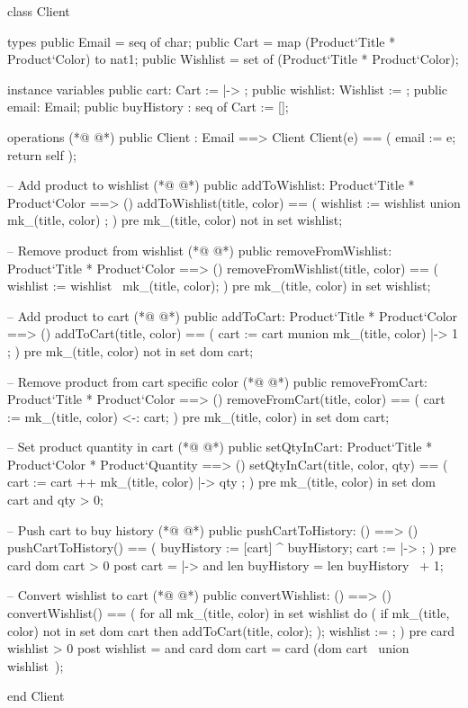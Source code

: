 \begin{vdmpp}[breaklines=true]
class Client

types
 public Email = seq of char;
 public Cart = map (Product`Title * Product`Color) to nat1;
 public Wishlist = set of (Product`Title * Product`Color);
 
instance variables
  public cart: Cart  := { |-> };
  public wishlist: Wishlist := {};
  public email: Email;
  public buyHistory : seq of Cart := [];
  
operations
(*@
\label{Client:15}
@*)
 public Client : Email ==> Client
 Client(e) == (
  email := e;
   return self
 );
 
 -- Add product to wishlist
(*@
\label{addToWishlist:22}
@*)
 public addToWishlist: Product`Title * Product`Color ==> ()
 addToWishlist(title, color) == (
  wishlist := wishlist union { mk_(title, color) };
 )
 pre mk_(title, color) not in set wishlist;
 
 -- Remove product from wishlist
(*@
\label{removeFromWishlist:29}
@*)
 public removeFromWishlist: Product`Title * Product`Color ==> ()
 removeFromWishlist(title, color) == (
  wishlist := wishlist \ {mk_(title, color)};
 )
 pre mk_(title, color) in set wishlist;
 
 -- Add product to cart
(*@
\label{addToCart:36}
@*)
 public addToCart: Product`Title * Product`Color ==> ()
 addToCart(title, color) == (
  cart := cart munion { mk_(title, color) |-> 1 };
 )
 pre mk_(title, color) not in set dom cart;
 
 -- Remove product from cart specific color
(*@
\label{removeFromCart:43}
@*)
 public removeFromCart: Product`Title * Product`Color ==> ()
 removeFromCart(title, color) == (
  cart := {mk_(title, color)} <-: cart;
 )
 pre mk_(title, color) in set dom cart;
 
 -- Set product quantity in cart
(*@
\label{setQtyInCart:50}
@*)
 public setQtyInCart: Product`Title * Product`Color * Product`Quantity ==> ()
 setQtyInCart(title, color, qty) == (
  cart := cart ++ { mk_(title, color) |-> qty };
 )
 pre mk_(title, color) in set dom cart
  and qty > 0;
  
 -- Push cart to buy history
(*@
\label{pushCartToHistory:58}
@*)
 public pushCartToHistory: () ==> ()
 pushCartToHistory() == (
  buyHistory := [cart] ^ buyHistory;
  cart := { |-> };
 )
 pre card dom cart > 0
 post cart = { |-> }
  and len buyHistory = len buyHistory~ + 1;
  
 -- Convert wishlist to cart
(*@
\label{convertWishlist:68}
@*)
 public convertWishlist: () ==> ()
 convertWishlist() == (
  for all mk_(title, color) in set wishlist
   do (
    if mk_(title, color) not in set dom cart
    then addToCart(title, color);
   );
  wishlist := { };
 )
 pre card wishlist > 0
 post wishlist = { }
  and card dom cart = card (dom cart~ union wishlist~);
  

end Client
\end{vdmpp}
